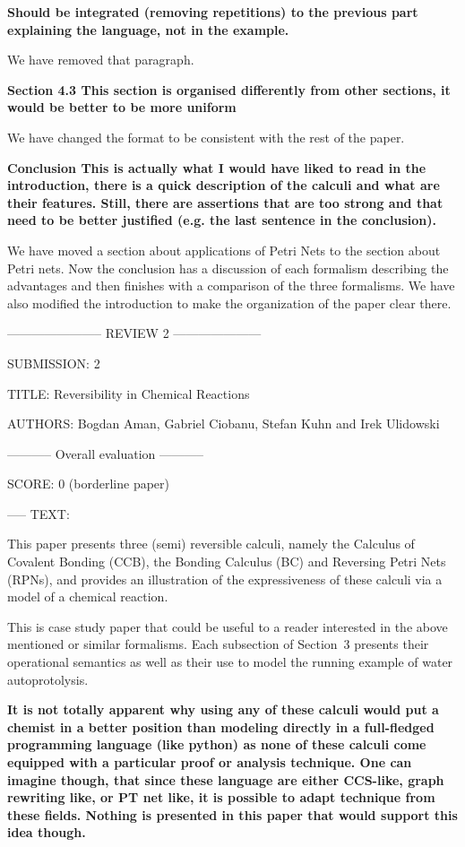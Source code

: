 \documentclass{article}
\begin{document}
\textbf{Should be integrated (removing repetitions) to the previous part explaining the language, not in the example.}

We have removed that paragraph.

\textbf{Section 4.3
This section is organised differently from other sections, it would be better to be more uniform}

We have changed the format to be consistent with the rest of the paper. 

\textbf{Conclusion
This is actually what I would have liked to read in the introduction, there is a quick description of the calculi and what are their features.
Still, there are assertions that are too strong and that need to be better justified (e.g. the last sentence in the conclusion).}

We have moved a section about applications of Petri Nets to the section about Petri nets. Now the conclusion has a discussion of each formalism describing the advantages and then finishes with a comparison of the three formalisms. We have also modified the introduction to make the organization of the paper clear there.

----------------------- REVIEW 2 ---------------------

SUBMISSION: 2

TITLE: Reversibility in Chemical Reactions

AUTHORS: Bogdan Aman, Gabriel Ciobanu, Stefan Kuhn and Irek Ulidowski

----------- Overall evaluation -----------

SCORE: 0 (borderline paper)

----- TEXT:

This paper presents three (semi) reversible calculi, namely the Calculus of Covalent Bonding (CCB), 
the Bonding Calculus (BC) and Reversing Petri Nets (RPNs), and provides an illustration of 
the expressiveness of these calculi via a model of a chemical reaction.

This is case study paper that could be useful to a reader interested in the above mentioned or similar 
formalisms. Each subsection of Section~3 presents their operational semantics as well as their 
use to model the running example of water autoprotolysis.

\textbf{It is not totally apparent why using any of these calculi would put a chemist in a better position than modeling directly in a full-fledged programming language (like python) as none of these calculi come equipped with a particular proof or analysis technique.  One can imagine though, that since these language are either CCS-like, graph rewriting like, or PT net like, it is possible to adapt technique from these fields. Nothing is presented in this paper that would support this idea though.}
\end{document}
